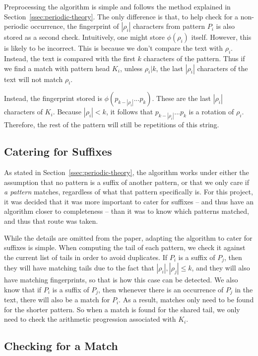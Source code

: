 \documentclass[ %
                    author={Dominic Joseph Moylett},
                    degree={MEng},
                     title={Dictionary Matching with Fingerprints},
                  subtitle={An Empirical Analysis},
                      type={research},
                      year={2015} ]{dissertation}
\begin{document}
Preprocessing the algorithm is simple and follows the method explained in Section~\ref{ssec:periodic-theory}. The only difference is that, to help check for a non-periodic occurrence, the fingerprint of $|\rho_i|$ characters from pattern $P_i$ is also stored as a second check. Intuitively, one might store $\phi(\rho_i)$ itself. However, this is likely to be incorrect. This is because we don't compare the text with $\rho_i$. Instead, the text is compared with the first $k$ characters of the pattern. Thus if we find a match with pattern head $K_i$, unless $\rho_i | k$, the last $|\rho_i|$ characters of the text will not match $\rho_i$.

Instead, the fingerprint stored is $\phi(p_{k - |\rho_i|}...p_k)$. These are the last $|\rho_i|$ characters of $K_i$. Because $|\rho_i| < k$, it follows that $p_{k - |\rho_i|}...p_k$ is a rotation of $\rho_i$. Therefore, the rest of the pattern will still be repetitions of this string.

\subsection{Catering for Suffixes}

As stated in Section~\ref{ssec:periodic-theory}, the algorithm works under either the assumption that no pattern is a suffix of another pattern, or that we only care if \textit{a pattern} matches, regardless of what that pattern specifically is. For this project, it was decided that it was more important to cater for suffixes -- and thus have an algorithm closer to completeness -- than it was to know which patterns matched, and thus that route was taken.

While the details are omitted from the paper, adapting the algorithm to cater for suffixes is simple. When computing the tail of each pattern, we check it against the current list of tails in order to avoid duplicates. If $P_i$ is a suffix of $P_j$, then they will have matching tails due to the fact that $|\rho_i|, |\rho_j| \leq k$, and they will also have matching fingerprints, so that is how this case can be detected. We also know that if $P_i$ is a suffix of $P_j$, then whenever there is an occurrence of $P_j$ in the text, there will also be a match for $P_i$. As a result, matches only need to be found for the shorter pattern. So when a match is found for the shared tail, we only need to check the arithmetic progression associated with $K_i$.

\subsection{Checking for a Match}
\end{document}
